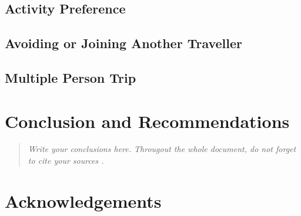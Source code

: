 \documentclass[12pt]{article}
\begin{document}
\subsection{Activity Preference}


\subsection{Avoiding or Joining Another Traveller}


\subsection{Multiple Person Trip}




\pagebreak

\section{Conclusion and Recommendations}
\label{sec:conc}


\begin{quote} \textit{
Write your conclusions here. Througout the whole document, do not forget to cite your sources \cite{example}.
} \end{quote}

\lipsum[3]



\pagebreak

\section{Acknowledgements}
\label{sec:acknow}

\end{document}
